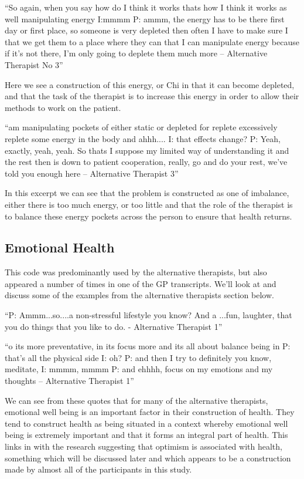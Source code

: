 ``So again, when you say how do I think it works thats how I think it works as well manipulating energy
I:mmmm
P: ammm, the energy has to be there first day or first place, so someone is very depleted then often I have to make sure I that we get them to a place where they can that I can manipulate energy because if it's not there, I'm only going to deplete them much more – Alternative Therapist No 3''

Here we see a construction of this energy, or Chi in that it can become depleted, and that the task of the therapist is to increase this energy in order to allow their methods to work on the patient. 

``am manipulating pockets of either static or depleted for replete excessively replete some energy in the body and ahhh....
I: that effects change?
P: Yeah, exactly, yeah, yeah. So thats I suppose my limited way of understanding it and the rest then is down to patient cooperation, really, go and do your rest, we've told you enough here – Alternative Therapist 3''

In this excerpt we can see that the problem is constructed as one of imbalance, either there is too much energy, or too little and that the role of the therapist is to balance these energy pockets across the person to ensure that health returns. 



\subsection{Emotional Health}

This code was predominantly used by the alternative therapists, but also appeared a number of times in one of the GP transcripts. We'll look at and discuss some of the examples from the alternative therapists section below. 

``P: Ammm...so....a non-stressful lifestyle you know? And a ...fun, laughter, that you do things that you like to do. - Alternative Therapist 1''

``o its more preventative, in its focus more and its all about balance being in
P: that's all the physical side
I: oh?
P: and then I try to definitely you know, meditate, 
I: mmmm, mmmm
P: and ehhhh, focus on my emotions and my thoughts – Alternative Therapist 1''

We can see from these quotes that for many of the alternative therapists, emotional well being is an important factor in their construction of health. They tend to construct health as being situated in a context whereby emotional well being is extremely important and that it forms an integral part of health. This links in with the research suggesting that optimism is associated with health, something which will be discussed later and which appears to be a construction made by almost all of the participants in this study. 

